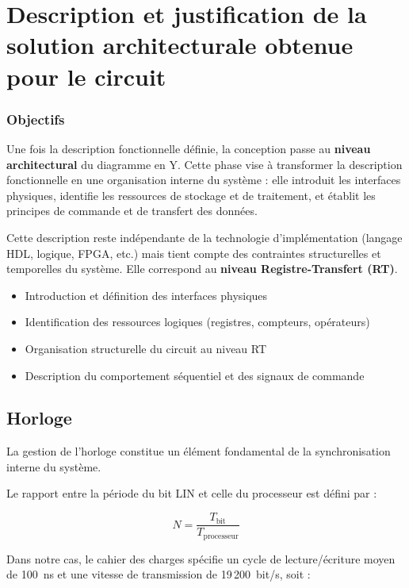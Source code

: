 \section{Description et justification de la solution architecturale obtenue pour le circuit}

\subsubsection*{Objectifs}

Une fois la description fonctionnelle définie, la conception passe au \textbf{niveau architectural} du diagramme en Y.  
Cette phase vise à transformer la description fonctionnelle en une organisation interne du système : 
elle introduit les interfaces physiques, identifie les ressources de stockage et de traitement, et 
établit les principes de commande et de transfert des données.

\medskip

Cette description reste indépendante de la technologie d’implémentation (langage HDL, logique, FPGA, etc.) 
mais tient compte des contraintes structurelles et temporelles du système.  
Elle correspond au \textbf{niveau Registre-Transfert (RT)}.

\begin{itemize}
    \item Introduction et définition des interfaces physiques
    \item Identification des ressources logiques (registres, compteurs, opérateurs)
    \item Organisation structurelle du circuit au niveau RT
    \item Description du comportement séquentiel et des signaux de commande
\end{itemize}

\vspace{1em}

\subsection{Horloge}

La gestion de l’horloge constitue un élément fondamental de la synchronisation interne du système.

Le rapport entre la période du bit LIN et celle du processeur est défini par :

\[
N = \frac{T_{\text{bit}}}{T_{\text{processeur}}}
\]

Dans notre cas, le cahier des charges spécifie un cycle de lecture/écriture moyen de 100~ns et une vitesse de transmission de 19\,200~bit/s, soit :

